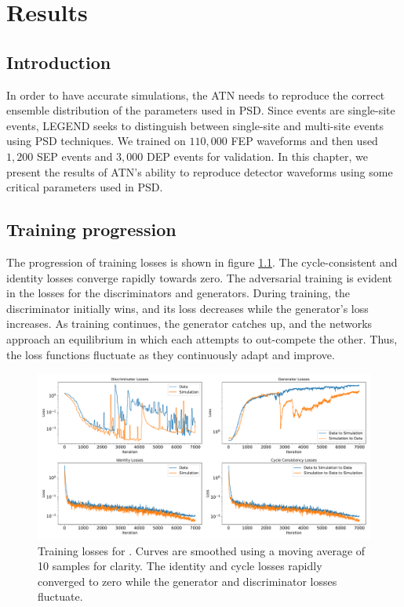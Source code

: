 \chapter{{\cpunet} Results}\label{chap:cpu_net_result}

\section{Introduction}
In order to have accurate simulations, the ATN needs to reproduce the correct ensemble distribution of the parameters used in PSD. Since {\onbb} events are single-site events, LEGEND seeks to distinguish between single-site and multi-site events using PSD techniques. We trained {\cpunet} on $110,000$ FEP waveforms and then used $1,200$ SEP events and $3,000$ DEP events for validation. In this chapter, we present the results of ATN's ability to reproduce detector waveforms using some critical parameters used in PSD. 

\section{Training progression}
The progression of training losses is shown in figure \ref{fig:training_loss}. The cycle-consistent and identity losses converge rapidly towards zero. The adversarial training is evident in the losses for the discriminators and generators. During training, the discriminator initially wins, and its loss decreases while the generator's loss increases. As training continues, the generator catches up, and the networks approach an equilibrium in which each attempts to out-compete the other. Thus, the loss functions fluctuate as they continuously adapt and improve.

\begin{figure}%
    \includegraphics[width=\linewidth,trim={0.5cm 0pc 0.5cm 0pc},clip]{ch8/figs/loss_funcs.pdf}
    \caption{Training losses for {\cpunet}. Curves are smoothed using a moving average of 10 samples for clarity. The identity and cycle losses rapidly converged to zero while the generator and discriminator losses fluctuate.} 
   \label{fig:training_loss}
\end{figure}


